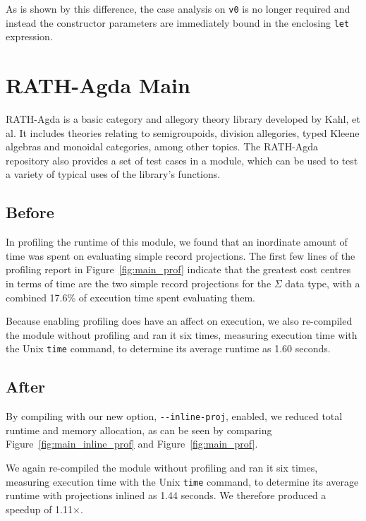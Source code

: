 As is shown by this difference, the case analysis on \lstinline{v0} is no longer required and instead the constructor parameters are immediately bound in the enclosing \lstinline{let} expression.

\section{RATH-Agda Main}
\label{sec:app_one}

RATH-Agda is a basic category and allegory theory library developed by Kahl, et al.\citep{Kahl-2017_RATH-Agda-2.2} It includes theories relating to semigroupoids, division allegories, typed Kleene algebras and monoidal categories, among other topics.\citep{Kahl-2017_RATH-Agda-2.2} The RATH-Agda repository also provides a set of test cases in a  module, which can be used to test a variety of typical uses of the library's functions.

\subsection{Before}

In profiling the runtime of this  module, we found that an inordinate amount of time was spent on evaluating simple record projections. The first few lines of the profiling report in Figure~\ref{fig:main_prof} indicate that the greatest cost centres in terms of time are the two simple record projections for the $\Sigma$ data type, with a combined 17.6\% of execution time spent evaluating them.

Because enabling profiling does have an affect on execution, we also re-compiled the module without profiling and ran it six times, measuring execution time with the Unix \texttt{time} command, to determine its average runtime as 1.60 seconds.



\subsection{After}

By compiling  with our new option, \texttt{-{}-inline-proj}, enabled, we reduced total runtime and memory allocation, as can be seen by comparing Figure~\ref{fig:main_inline_prof} and Figure~\ref{fig:main_prof}.

We again re-compiled the module without profiling and ran it six times, measuring execution time with the Unix \texttt{time} command, to determine its average runtime with projections inlined as 1.44 seconds. We therefore produced a speedup of 1.11$\times$.


